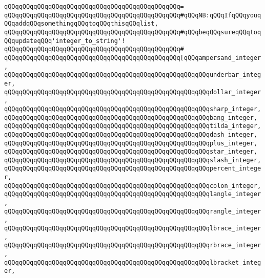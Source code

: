 \verb|qQQqqQQqqQQqqQQqqQQqqQQqqQQqqQQqqQQqqQQqqQQqqQQq=|\newline
\verb|qQQqqQQqqQQqqQQqqQQqqQQqqQQqqQQqqQQqqQQqqQQqqQQq#qQQqNB:qQQqIfqQQqyouqQQqaddqQQqsomethingqQQqtoqQQqthisqQQqlist,|\newline
\verb|qQQqqQQqqQQqqQQqqQQqqQQqqQQqqQQqqQQqqQQqqQQqqQQq#qQQqbeqQQqsureqQQqtoqQQqupdateqQQq'integer_to_string'!|\newline
\verb|qQQqqQQqqQQqqQQqqQQqqQQqqQQqqQQqqQQqqQQqqQQqqQQq#|\newline
\verb|qQQqqQQqqQQqqQQqqQQqqQQqqQQqqQQqqQQqqQQqqQQqqQQq[qQQqampersand_integer,|\newline
\verb|qQQqqQQqqQQqqQQqqQQqqQQqqQQqqQQqqQQqqQQqqQQqqQQqqQQqqQQqunderbar_integer,|\newline
\verb|qQQqqQQqqQQqqQQqqQQqqQQqqQQqqQQqqQQqqQQqqQQqqQQqqQQqqQQqdollar_integer,|\newline
\verb|qQQqqQQqqQQqqQQqqQQqqQQqqQQqqQQqqQQqqQQqqQQqqQQqqQQqqQQqsharp_integer,|\newline
\verb|qQQqqQQqqQQqqQQqqQQqqQQqqQQqqQQqqQQqqQQqqQQqqQQqqQQqqQQqbang_integer,|\newline
\verb|qQQqqQQqqQQqqQQqqQQqqQQqqQQqqQQqqQQqqQQqqQQqqQQqqQQqqQQqtilda_integer,|\newline
\verb|qQQqqQQqqQQqqQQqqQQqqQQqqQQqqQQqqQQqqQQqqQQqqQQqqQQqqQQqdash_integer,|\newline
\verb|qQQqqQQqqQQqqQQqqQQqqQQqqQQqqQQqqQQqqQQqqQQqqQQqqQQqqQQqplus_integer,|\newline
\verb|qQQqqQQqqQQqqQQqqQQqqQQqqQQqqQQqqQQqqQQqqQQqqQQqqQQqqQQqstar_integer,|\newline
\verb|qQQqqQQqqQQqqQQqqQQqqQQqqQQqqQQqqQQqqQQqqQQqqQQqqQQqqQQqslash_integer,|\newline
\verb|qQQqqQQqqQQqqQQqqQQqqQQqqQQqqQQqqQQqqQQqqQQqqQQqqQQqqQQqpercent_integer,|\newline
\verb|qQQqqQQqqQQqqQQqqQQqqQQqqQQqqQQqqQQqqQQqqQQqqQQqqQQqqQQqcolon_integer,|\newline
\verb|qQQqqQQqqQQqqQQqqQQqqQQqqQQqqQQqqQQqqQQqqQQqqQQqqQQqqQQqlangle_integer,|\newline
\verb|qQQqqQQqqQQqqQQqqQQqqQQqqQQqqQQqqQQqqQQqqQQqqQQqqQQqqQQqrangle_integer,|\newline
\verb|qQQqqQQqqQQqqQQqqQQqqQQqqQQqqQQqqQQqqQQqqQQqqQQqqQQqqQQqlbrace_integer,|\newline
\verb|qQQqqQQqqQQqqQQqqQQqqQQqqQQqqQQqqQQqqQQqqQQqqQQqqQQqqQQqrbrace_integer,|\newline
\verb|qQQqqQQqqQQqqQQqqQQqqQQqqQQqqQQqqQQqqQQqqQQqqQQqqQQqqQQqlbracket_integer,|\newline
